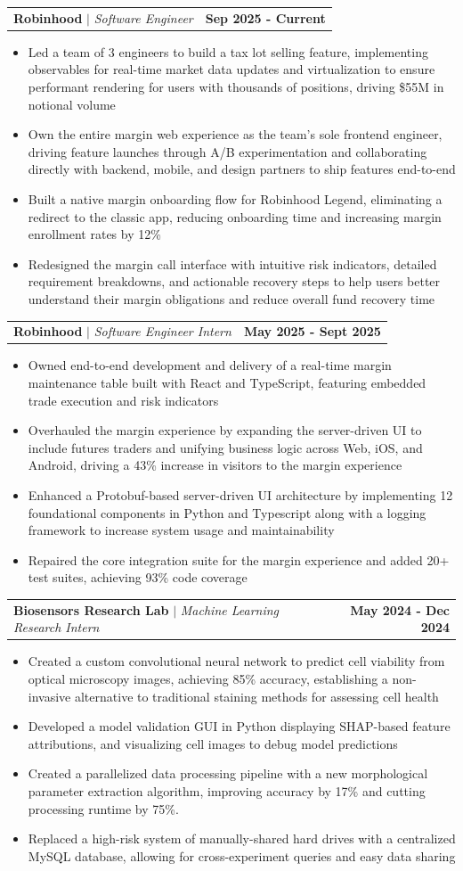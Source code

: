\documentclass[11pt]{article}
\makeatletter
\newcommand{\resumeItem}[1]{
  \item\small{
    {\fontfamily{lmss}#1 \vspace{-2pt}}
  }
}
\newcommand{\resumeSubheadingUpd}[4]{
  \vspace{2pt}\item
    \begin{tabular*}{0.95\textwidth}[t]{l@{\extracolsep{\fill}}r}
      \hspace{1.2em}\textbf{#1} $|$ \textit{\small#3} & {\bfseries #2}
    \end{tabular*}\vspace{-7pt}
}
\newcommand{\resumeItemListStart}{\begin{itemize}}
\newcommand{\resumeItemListEnd}{\end{itemize}\vspace{-5pt}}
\makeatother
\begin{document}
\resumeSubheadingUpd{Robinhood}{Sep 2025 - Current}{Software Engineer}{Toronto, ON}
\vspace{0.3em}
\resumeItemListStart
\resumeItem{Led a team of 3 engineers to build a tax lot selling feature, implementing observables for real-time market data updates and virtualization to ensure performant rendering for users with thousands of positions, driving \$55M in notional volume}
\resumeItem{Own the entire margin web experience as the team's sole frontend engineer, driving feature launches through A/B experimentation and collaborating directly with backend, mobile, and design partners to ship features end-to-end}
\resumeItem{Built a native margin onboarding flow for Robinhood Legend, eliminating a redirect to the classic app, reducing onboarding time and increasing margin enrollment rates by 12\%}
\resumeItem{Redesigned the margin call interface with intuitive risk indicators, detailed requirement breakdowns, and actionable recovery steps to help users better understand their margin obligations and reduce overall fund recovery time}
\resumeItemListEnd


\resumeSubheadingUpd{Robinhood}{May 2025 - Sept 2025}{Software Engineer Intern}{Toronto, ON}
\vspace{0.3em}
\resumeItemListStart
\resumeItem{Owned end-to-end development and delivery of a real-time margin maintenance table built with React and TypeScript, featuring embedded trade execution and risk indicators}
\resumeItem{Overhauled the margin experience by expanding the server-driven UI to include futures traders and unifying business logic across Web, iOS, and Android, driving a 43\% increase in visitors to the margin experience}
\resumeItem{Enhanced a Protobuf-based server-driven UI architecture by implementing 12 foundational components in Python and Typescript along with a logging framework to increase system usage and maintainability}
\resumeItem{Repaired the core integration suite for the margin experience and added 20+ test suites, achieving 93\% code coverage}
\resumeItemListEnd

\resumeSubheadingUpd{Biosensors Research Lab}{May 2024 - Dec 2024}{Machine Learning Research Intern}{Winnipeg, MB}
\vspace{0.3em}
\resumeItemListStart
\resumeItem{Created a custom convolutional neural network to predict cell viability from optical microscopy images, achieving 85\% accuracy, establishing a non-invasive alternative to traditional staining methods for assessing cell health}
\resumeItem{Developed a model validation GUI in Python displaying SHAP-based feature attributions, and visualizing cell images to debug model predictions}
\resumeItem{Created a parallelized data processing pipeline with a new morphological parameter extraction algorithm, improving accuracy by 17\% and cutting processing runtime by 75\%.}
\resumeItem{Replaced a high-risk system of manually-shared hard drives with a centralized MySQL database, allowing for cross-experiment queries and easy data sharing}
\resumeItemListEnd
\end{document}
